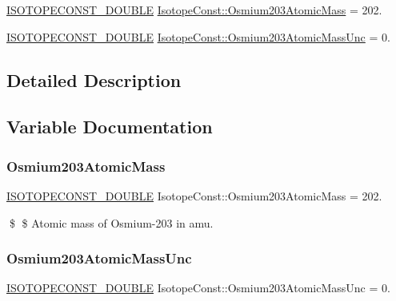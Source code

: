 \begin{DoxyCompactItemize}
\item 
\mbox{\hyperlink{group___isotope_const-_macros_ga8f45a7272ce02c0b4c65c44636ed719a}{I\+S\+O\+T\+O\+P\+E\+C\+O\+N\+S\+T\+\_\+\+D\+O\+U\+B\+LE}} \mbox{\hyperlink{group___isotope_const-_osmium-_os203_ga16b0f5647c6ce3a6b0d360e3c3857e17}{Isotope\+Const\+::\+Osmium203\+Atomic\+Mass}} = 202.
\item 
\mbox{\hyperlink{group___isotope_const-_macros_ga8f45a7272ce02c0b4c65c44636ed719a}{I\+S\+O\+T\+O\+P\+E\+C\+O\+N\+S\+T\+\_\+\+D\+O\+U\+B\+LE}} \mbox{\hyperlink{group___isotope_const-_osmium-_os203_ga7a95eecf9ad4f479a5033c2fddb69e75}{Isotope\+Const\+::\+Osmium203\+Atomic\+Mass\+Unc}} = 0.
\end{DoxyCompactItemize}


\subsection{Detailed Description}


\subsection{Variable Documentation}
\mbox{\label{group___isotope_const-_osmium-_os203_ga16b0f5647c6ce3a6b0d360e3c3857e17}} 
\subsubsection{\texorpdfstring{Osmium203\+Atomic\+Mass}{Osmium203AtomicMass}}
{\footnotesize\ttfamily \mbox{\hyperlink{group___isotope_const-_macros_ga8f45a7272ce02c0b4c65c44636ed719a}{I\+S\+O\+T\+O\+P\+E\+C\+O\+N\+S\+T\+\_\+\+D\+O\+U\+B\+LE}} Isotope\+Const\+::\+Osmium203\+Atomic\+Mass = 202.}

\$ \$ Atomic mass of Osmium-\/203 in amu. \mbox{\label{group___isotope_const-_osmium-_os203_ga7a95eecf9ad4f479a5033c2fddb69e75}} 
\subsubsection{\texorpdfstring{Osmium203\+Atomic\+Mass\+Unc}{Osmium203AtomicMassUnc}}
{\footnotesize\ttfamily \mbox{\hyperlink{group___isotope_const-_macros_ga8f45a7272ce02c0b4c65c44636ed719a}{I\+S\+O\+T\+O\+P\+E\+C\+O\+N\+S\+T\+\_\+\+D\+O\+U\+B\+LE}} Isotope\+Const\+::\+Osmium203\+Atomic\+Mass\+Unc = 0.}

